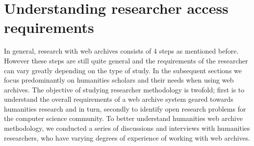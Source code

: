 

















\section{Understanding researcher access requirements}%
\label{sec:understanding_researcher_requirements}

In general, research with web archives consists of 4 steps as mentioned before. However these steps are still quite general and the requirements of the researcher can vary greatly depending on the type of study. In the subsequent sections we focus predominantly on humanities scholars and their needs when using web archives. The objective of studying researcher methodology is twofold; first is to understand the overall requirements of a web archive system geared towards humanities research and in turn, secondly to identify open research problems for the computer science community. To better understand humanities web archive methodology, we conducted a series of discussions and interviews with humanities researchers, who have varying degrees of experience of working with web archives.

